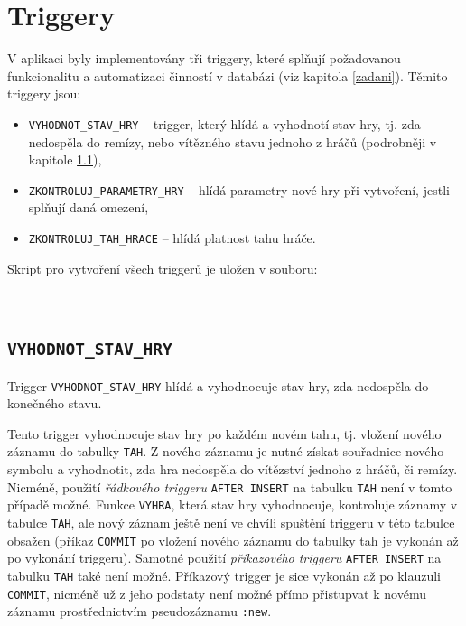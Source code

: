 \documentclass[
11pt,
a4paper,
pdftex,
czech,
titlepage
]{report}
\begin{document}
\section{Triggery}
V aplikaci byly implementovány tři triggery, které splňují požadovanou funkcionalitu a automatizaci činností v databázi (viz kapitola \ref{zadani}). Těmito triggery jsou:
\begin{itemize}
    \item \texttt{VYHODNOT\_STAV\_HRY} -- trigger, který hlídá a vyhodnotí stav hry, tj. zda nedospěla do remízy, nebo vítězného stavu jednoho z hráčů (podrobněji v kapitole \ref{vyhodnot_stav_kap}),
    \item \texttt{ZKONTROLUJ\_PARAMETRY\_HRY} -- hlídá parametry nové hry při vytvoření, jestli splňují daná omezení,
    \item \texttt{ZKONTROLUJ\_TAH\_HRACE} -- hlídá platnost tahu hráče.
\end{itemize}

\noindent Skript pro vytvoření všech triggerů je uložen v souboru:
\begin{center}
\noindent {}\\[1\baselineskip]
\end{center}

\subsection{\texttt{VYHODNOT\_STAV\_HRY}}\label{vyhodnot_stav_kap}
Trigger \texttt{VYHODNOT\_STAV\_HRY} hlídá a vyhodnocuje stav hry, zda nedospěla do konečného stavu. 

Tento trigger vyhodnocuje stav hry po každém novém tahu, tj. vložení nového záznamu do tabulky \texttt{TAH}. Z nového záznamu je nutné získat souřadnice nového symbolu a vyhodnotit, zda hra nedospěla do vítězství jednoho z hráčů, či remízy. Nicméně, použití \textit{řádkového triggeru} \texttt{AFTER INSERT} na tabulku \texttt{TAH} není v tomto případě možné. Funkce \texttt{VYHRA}, která stav hry vyhodnocuje, kontroluje záznamy v tabulce \texttt{TAH}, ale nový záznam ještě není ve chvíli spuštění triggeru v této tabulce obsažen (příkaz \texttt{COMMIT} po vložení nového záznamu do tabulky tah je vykonán až po vykonání triggeru). Samotné použití \textit{příkazového triggeru} \texttt{AFTER INSERT} na tabulku \texttt{TAH} také není možné. Příkazový trigger je sice vykonán až po klauzuli \texttt{COMMIT}, nicméně už z jeho podstaty není možné přímo přistupvat k novému záznamu prostřednictvím pseudozáznamu \texttt{:new}.
\end{document}
